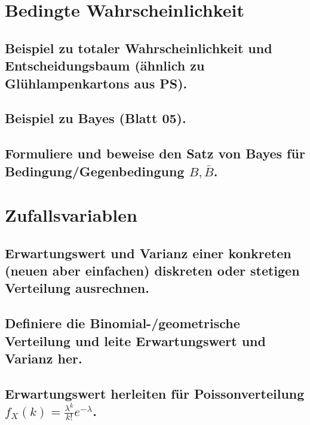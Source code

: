 \documentclass[a4paper,10pt]{article}
\begin{document}
\subsection{}

\newpage
\section{Bedingte Wahrscheinlichkeit}
\subsection{Beispiel zu totaler Wahrscheinlichkeit und Entscheidungsbaum (ähnlich zu Glühlampenkartons aus PS).}

\subsection{Beispiel zu Bayes (Blatt 05).}

\subsection{Formuliere und beweise den Satz von Bayes für Bedingung/Gegenbedingung $B, \bar{B}$.}

\newpage
\section{Zufallsvariablen}
\subsection{Erwartungswert und Varianz einer konkreten (neuen aber einfachen) diskreten oder stetigen Verteilung ausrechnen.}

\subsection{Definiere die Binomial-/geometrische Verteilung und leite Erwartungswert und Varianz her.}

\subsection{Erwartungswert herleiten für Poissonverteilung $f_X (k)=\frac{\lambda^k}{k!}e^{-\lambda}$.}
\end{document}
